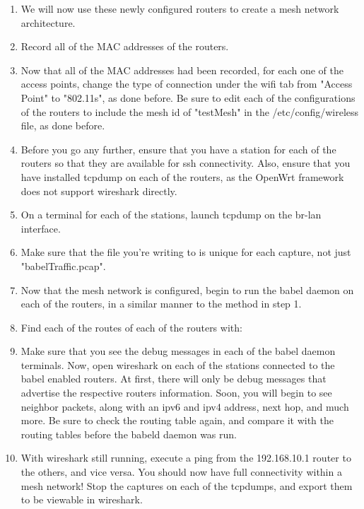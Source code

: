 \documentclass[main.tex]{subfiles}
\begin{document}
\begin{itemize}
\begin{enumerate}[noitemsep,label=$\bullet$,leftmargin=20mm,labelsep=0.5cm]
\item We will now use these newly configured routers to create a mesh network architecture. 

\item Record all of the MAC addresses of the routers. 

\item Now that all of the MAC addresses had been recorded, for each one of the access points, change the type of connection under the wifi tab from "Access Point" to "802.11s", as done before. Be sure to edit each of the configurations of the routers to include the mesh id of "testMesh" in the /etc/config/wireless file, as done before.

\item Before you go any further, ensure that you have a station for each of the routers so that they are available for ssh connectivity. Also, ensure that you have installed tcpdump on each of the routers, as the OpenWrt framework does not support wireshark directly.

\item On a terminal for each of the stations, launch tcpdump on the br-lan interface.


\item Make sure that the file you're writing to is unique for each capture, not just "babelTraffic.pcap".

\item Now that the mesh network is configured, begin to run the babel daemon on each of the routers, in a similar manner to the method in step 1.



\item Find each of the routes of each of the routers with:


\item Make sure that you see the debug messages in each of the babel daemon terminals. Now, open wireshark on each of the stations connected to the babel enabled routers. At first, there will only be debug messages that advertise the respective routers information. Soon, you will begin to see neighbor packets, along with an ipv6 and ipv4 address, next hop, and much more. Be sure to check the routing table again, and compare it with the routing tables before the babeld daemon was run. 

\item With wireshark still running, execute a ping from the 192.168.10.1 router to the others, and vice versa. You should now have full connectivity within a mesh network! Stop the captures on each of the tcpdumps, and export them to be viewable in wireshark.


\end{enumerate}
     
\end{itemize}
\end{document}
